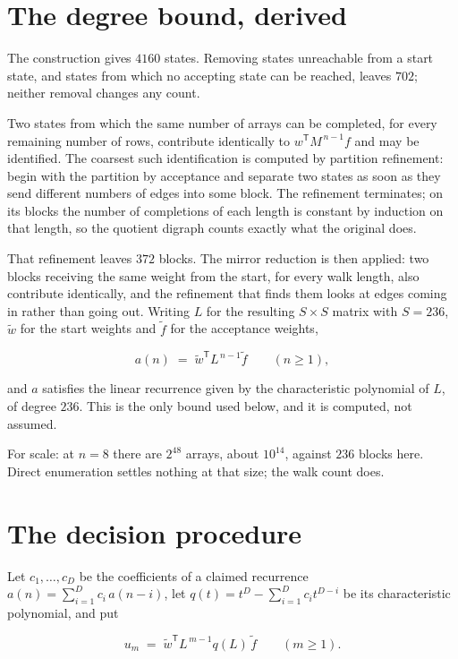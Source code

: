 \documentclass[11pt]{article}
\theoremstyle{definition}
\begin{document}
\section{The degree bound, derived}

The construction gives $4160$ states. Removing states unreachable from a start state, and states from which no accepting state can be reached, leaves $702$; neither removal changes any count.

Two states from which the same number of arrays can be completed, for every remaining number of rows, contribute identically to $w^{\mathsf T}M^{\,n-1}f$ and may be identified. The coarsest such identification is computed by partition refinement: begin with the partition by acceptance and separate two states as soon as they send different numbers of edges into some block. The refinement terminates; on its blocks the number of completions of each length is constant by induction on that length, so the quotient digraph counts exactly what the original does.

That refinement leaves $372$ blocks. The mirror reduction is then applied: two blocks receiving the same weight from the start, for every walk length, also contribute identically, and the refinement that finds them looks at edges coming in rather than going out. Writing $L$ for the resulting $S \times S$ matrix with $S = 236$, $\tilde w$ for the start weights and $\tilde f$ for the acceptance weights,

\[a(n) \;=\; \tilde w^{\mathsf T} L^{\,n-1} \tilde f \qquad (n \ge 1),\]

and $a$ satisfies the linear recurrence given by the characteristic polynomial of $L$, of degree $236$. This is the only bound used below, and it is computed, not assumed.

For scale: at $n = 8$ there are $2^{48}$ arrays, about $10^{14}$, against $236$ blocks here. Direct enumeration settles nothing at that size; the walk count does.

\section{The decision procedure}

Let $c_1,\dots,c_D$ be the coefficients of a claimed recurrence $a(n) = \sum_{i=1}^{D} c_i\,a(n-i)$, let $q(t) = t^{D} - \sum_{i=1}^{D} c_i t^{D-i}$ be its characteristic polynomial, and put

\[u_m \;=\; \tilde w^{\mathsf T} L^{\,m-1} q(L)\,\tilde f \qquad (m \ge 1).\]
\end{document}
